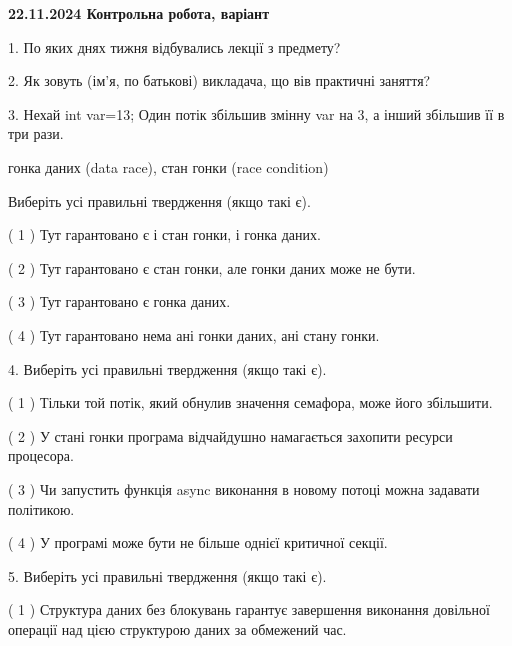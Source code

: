 \documentclass[12pt, ukrainian]{article}
\begin{document}
\vspace{4mm}
\newpage
\begin {large}

\textbf{22.11.2024 Контрольна робота, варіант  }\par


{
1. По яких днях тижня відбувались лекції з предмету?



\vspace{5mm}
2. Як зовуть (ім'я, по батькові) викладача, що вів практичні заняття?



\vspace{5mm}
3. Нехай int var=13; Один потік збільшив змінну var на 3, а інший збільшив її в три рази.

гонка даних (data race), стан гонки (race condition)

Виберіть усі правильні твердження (якщо такі є).\par
\vspace{2mm}
( 1 ) Тут гарантовано є і стан гонки, і гонка даних.%

( 2 ) Тут гарантовано є стан гонки, але гонки даних може не бути.%

( 3 ) Тут гарантовано є гонка даних.%

( 4 ) Тут гарантовано нема ані гонки даних, ані стану гонки.%


\vspace{5mm}
4. Виберіть усі правильні твердження (якщо такі є).\par
\vspace{2mm}

( 1 ) Тільки той потік, який обнулив значення семафора, може його збільшити.%

( 2 ) У стані гонки програма відчайдушно намагається захопити ресурси процесора.%

( 3 ) Чи запустить функція  async виконання в новому потоці можна задавати політикою.%

( 4 ) У програмі може бути не більше однієї критичної секції.%


\vspace{5mm}
5. Виберіть усі правильні твердження (якщо такі є).\par
\vspace{2mm}

( 1 ) Структура даних без блокувань гарантує завершення виконання довільної операції над цією структурою даних за обмежений час.%

}
\end{large}
\end{document}
